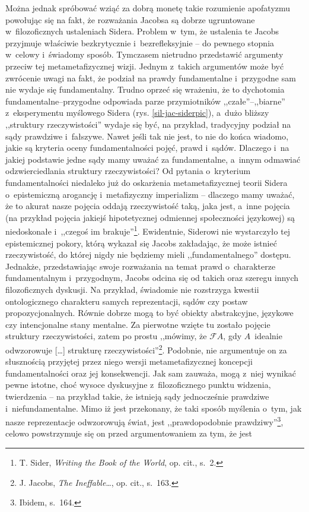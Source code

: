 Można jednak spróbować wziąć za dobrą monetę takie rozumienie apofatyzmu powołując się na fakt, że rozważania Jacobsa są dobrze ugruntowane w~filozoficznych ustaleniach Sidera. Problem w~tym, że ustalenia te Jacobs przyjmuje właściwie bezkrytycznie i~bezrefleksyjnie -- do pewnego stopnia w~celowy i~świadomy sposób. Tymczasem nietrudno przedstawić argumenty przeciw tej metametafizycznej wizji. Jednym z~takich argumentów może być zwrócenie uwagi na fakt, że podział na prawdy fundamentalne i~przygodne sam nie wydaje się fundamentalny. Trudno oprzeć się wrażeniu, że to dychotomia fundamentalne–przygodne odpowiada parze przymiotników ,,czałe''–,,biarne'' z~eksperymentu myślowego Sidera (rys. \ref{sil-jac-siderpic}), a~dużo bliższy ,,struktury rzeczywistości'' wydaje się być, na przykład, tradycyjny podział na sądy prawdziwe i~fałszywe. Nawet jeśli tak nie jest, to nie do końca wiadomo, jakie są kryteria oceny fundamentalności pojęć, prawd i~sądów. Dlaczego i~na jakiej podstawie jedne sądy mamy uważać za fundamentalne, a~innym odmawiać odzwierciedlania struktury rzeczywistości? Od pytania o~kryterium fundamentalności niedaleko już do oskarżenia metametafizycznej teorii Sidera o~epistemiczną arogancję i~metafizyczny imperializm -- dlaczego mamy uważać, że to akurat nasze pojęcia oddają rzeczywistość taką, jaka jest, a~inne pojęcia (na przykład pojęcia jakiejś hipotetycznej odmiennej społeczności językowej) są niedoskonałe i~,,czegoś im brakuje''\footnote{T. Sider, \textit{Writing the Book of the World}, op. cit., s.~2.}. Ewidentnie, Siderowi nie wystarczyło tej epistemicznej pokory, którą wykazał się Jacobs zakładając, że może istnieć rzeczywistość, do której nigdy nie będziemy mieli ,,fundamentalnego'' dostępu. Jednakże, przedstawiając swoje rozważania na temat prawd o~charakterze fundamentalnym i~przygodnym, Jacobs odcina się od takich oraz szeregu innych filozoficznych dyskusji. Na przykład, świadomie nie rozstrzyga kwestii ontologicznego charakteru samych reprezentacji, sądów czy postaw propozycjonalnych. Równie dobrze mogą to być obiekty abstrakcyjne, językowe czy intencjonalne stany mentalne. Za pierwotne wzięte tu zostało pojęcie struktury rzeczywistości, zatem po prostu ,,mówimy, że \guillemotleft$\mathscr{F}A$\guillemotright, gdy $A$~idealnie odwzorowuje [\ldots] strukturę rzeczywistości''\footnote{J. Jacobs, \textit{The Ineffable}\ldots, op. cit., s.~163.}. Podobnie, nie argumentuje on za słusznością przyjętej przez niego wersji metametafizycznej koncepcji fundamentalności oraz jej konsekwencji. Jak sam zauważa, mogą z~niej wynikać pewne istotne, choć wysoce dyskusyjne z~filozoficznego punktu widzenia, twierdzenia -- na przykład takie, że istnieją sądy jednocześnie prawdziwe i~niefundamentalne. Mimo iż jest przekonany, że taki sposób myślenia o~tym, jak nasze reprezentacje odwzorowują świat, jest ,,prawdopodobnie prawdziwy''\footnote{Ibidem, s.~164.}, celowo powstrzymuje się on przed argumentowaniem za tym, że jest
